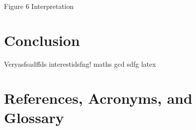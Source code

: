 \documentclass[12pt]{scrartcl}
\begin{document}
    Figure 6 Interpretation

\section{Conclusion}

  Veryasfsadffds interestidsfng! \gls{maths} \acrfull{gcd} sdfg \gls{latex}

\clearpage


\section{References, Acronyms, and Glossary}





\printglossary[type=\acronymtype]

\printglossary

% 

% 


\end{document}
